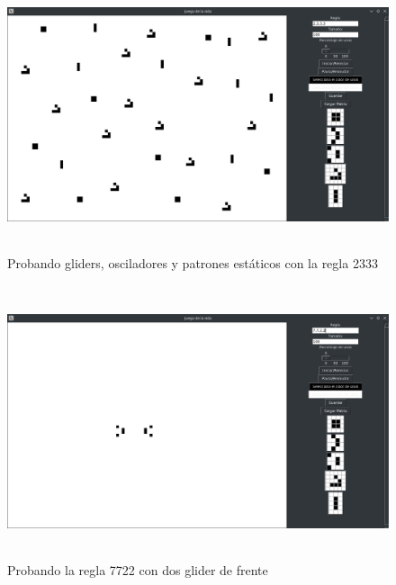 \begin{figure}[H]
\begin{center}
 \includegraphics[width=12cm, height=8cm]{./img/prueba.png}
 \caption{Probando gliders, osciladores y patrones estáticos con la regla 2333}
 \label{fig:prueba}
\end{center}
\end{figure}

\begin{figure}[H]
\begin{center}
 \includegraphics[width=12cm, height=8cm]{./img/inicio2.png}
 \caption{Probando la regla 7722 con dos glider de frente}
 \label{fig:inicio2}
\end{center}
\end{figure}


